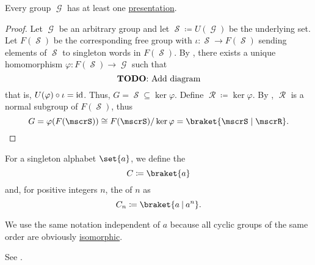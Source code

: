 \begin{theorem}\label{thm:every_group_is_representable}
  Every group \( \mscrG \) has at least one \hyperref[def:group_presentation]{presentation}.
\end{theorem}
\begin{proof}
  Let \( \mscrG \) be an arbitrary group and let \( \mscrS \coloneqq U(\mscrG) \) be the underlying set. Let \( F(\mscrS) \) be the corresponding free group with \( \iota: \mscrS \to F(\mscrS) \) sending elements of \( \mscrS \) to singleton words in \( F(\mscrS) \). By , there exists a unique homomorphism \( \varphi: F(\mscrS) \to \mscrG \) such that
  \begin{equation*}
    \text{\todo{Add diagram}}\iffalse\begin{mplibcode}
      beginfig(1);
      input metapost/graphs;

      v1 := thelabel("$\mscrS$", origin);
      v2 := thelabel("$U(F(\mscrS))$", (-1, -1) scaled u);
      v3 := thelabel("$U(G)$", (1, -1) scaled u);

      a1 := straight_arc(v1, v2);
      a2 := straight_arc(v1, v3);

      d1 := straight_arc(v2, v3);

      draw_vertices(v);
      draw_arcs(a);

      drawarrow d1 dotted;

      label.ulft("$\iota$", straight_arc_midpoint of a1);
      label.urt("$\id$", straight_arc_midpoint of a2);
      label.top("$U(\varphi)$", straight_arc_midpoint of d1);
      endfig;
    \end{mplibcode}\fi
  \end{equation*}
  that is, \( U(\varphi) \circ \iota = \operatorname{id} \). Thus, \( G = \mscrS \subseteq \ker \varphi \). Define \( \mscrR \coloneqq \ker \varphi \). By , \( \mscrR \) is a normal subgroup of \( F(\mscrS) \), thus
  \begin{equation*}
    G = \varphi(F(\mscrS)) \cong F(\mscrS) / \ker \varphi = \braket{ \mscrS \mid \mscrR }.
  \end{equation*}
\end{proof}

\begin{definition}\label{def:cyclic_group}
  For a singleton alphabet \( \set{ a } \), we define the 
  \begin{equation*}
    C \coloneqq \braket{a}
  \end{equation*}
  and, for positive integers \( n \), the  of  \( n \) as
  \begin{equation*}
    C_n \coloneqq \braket{a \given a^n}.
  \end{equation*}

  We use the same notation independent of \( a \) because all cyclic groups of the same order are obviously \hyperref[def:group/homomorphism]{isomorphic}.

  See .
\end{definition}

